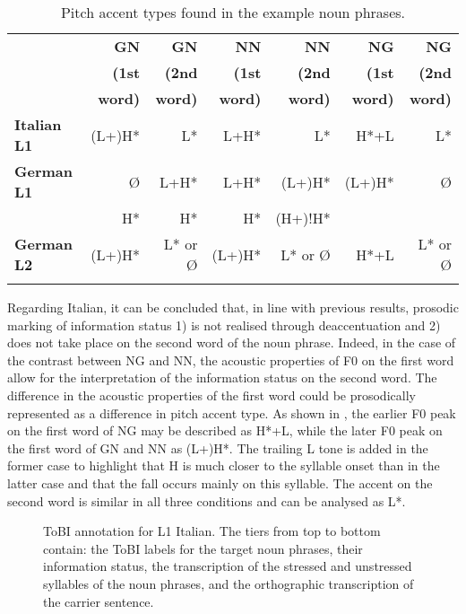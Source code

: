 \begin{table}
\begin{tabular}{lrrrrrr}
\lsptoprule
 & \textbf{GN} & \textbf{GN} & \textbf{NN} & \textbf{NN} & \textbf{NG} & \textbf{NG}\\
& \textbf{(1st} & \textbf{(2nd} & \textbf{(1st} & \textbf{(2nd} & \textbf{(1st} & \textbf{(2nd}\\
& \textbf{word)} & \textbf{word)} & \textbf{word)} & \textbf{word)} & \textbf{word)} & \textbf{word)}\\
\midrule
\textbf{Italian} \textbf{L1} & (L+)H* & L* & L+H* & L* & H*+L & L*\\
\textbf{German} \textbf{L1} & Ø & L+H* & L+H* & (L+)H* & (L+)H* & Ø \\
& H* & H* & H* & (H+)!H* & & \\
\textbf{German} \textbf{L2} & (L+)H* & L* or Ø & (L+)H* & L* or Ø & H*+L & L* or Ø\\
\lspbottomrule
\end{tabular}
\caption{Pitch accent types found in the example noun phrases.}
\label{tab:2.9}
\end{table}


Regarding Italian, it can be concluded that, in line with previous results, prosodic marking of information status 1) is not realised through deaccentuation and 2) does not take place on the second word of the noun phrase. Indeed, in the case of the contrast between NG and NN, the acoustic properties of F0 on the first word allow for the interpretation of the information status on the second word. The difference in the acoustic properties of the first word could be prosodically represented as a difference in pitch accent type. As shown in , the earlier F0 peak on the first word of NG may be described as H*+L, while the later F0 peak on the first word of GN and NN as (L+)H*. The trailing L tone is added in the former case to highlight that H is much closer to the syllable onset than in the latter case and that the fall occurs mainly on this syllable. The accent on the second word is similar in all three conditions and can be analysed as L*.

\begin{figure}



\caption{\label{fig:2.27} ToBI annotation for L1 Italian. The tiers from top to bottom contain: the ToBI labels for the target noun phrases, their information status, the transcription of the stressed and unstressed syllables of the noun phrases, and the orthographic transcription of the carrier sentence.}
\end{figure}


